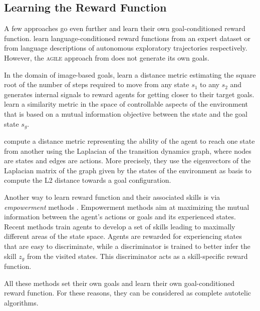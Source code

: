 \subsection{Learning the Reward Function}
\label{sec:survey_learning_goal_rep_rew}

A few approaches go even further and learn their own goal-conditioned reward function. \cite{bahdanau2018learning,imagine} learn language-conditioned reward functions from an expert dataset or from language descriptions of autonomous exploratory trajectories respectively. However, the \textsc{agile} approach from \cite{bahdanau2018learning} does not generate its own goals.

In the domain of image-based goals, \cite{venkattaramanujam2019self,hartikainen2019dynamical} learn a distance metric estimating the square root of the number of steps required to move from any state $s_1$ to any $s_2$ and generates internal signals to reward agents for getting closer to their target goals. \cite{warde2018unsupervised} learn a similarity metric in the space of controllable aspects of the environment that is based on a mutual information objective between the state and the goal state $s_g$.

\cite{wu2018laplacian} compute a distance metric representing the ability of the agent to reach one state from another using the Laplacian of the transition dynamics graph, where nodes are states and edges are actions. More precisely, they use the eigenvectors of the Laplacian matrix of the graph given by the states of the environment as basis to compute the L2 distance towards a goal configuration.

Another way to learn reward function and their associated skills is via \textit{empowerment} methods \cite{mohamed_variational_2015,gregor2016variational,achiam_variational_2018,eysenbach2018diversity,dai_empowerment-based_2020,sharma_dynamics-aware_2020,choi_variational_2021}. Empowerment methods aim at maximizing the mutual information between the agent's actions or goals and its experienced states. Recent methods train agents to develop a set of skills leading to maximally different areas of the state space. Agents are rewarded for experiencing states that are easy to discriminate, while a discriminator is trained to better infer the skill $z_g$ from the visited states. This discriminator acts as a skill-specific reward function. 

All these methods set their own goals and learn their own goal-conditioned reward function. For these reasons, they can be considered as complete autotelic \rl algorithms.

